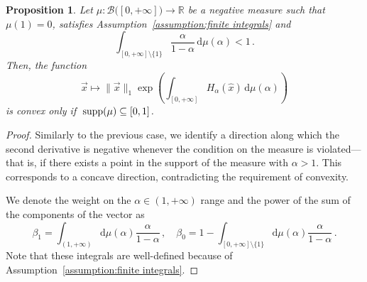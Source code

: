 \documentclass[aps,pra,11pt,onecolumn,nofootinbib,tightenlines]{revtex4-2}
\newtheorem{proposition}[theorem]{Proposition}
\theoremstyle{definition}
\def \d {\mathrm{d}}
\newcommand{\mc}[1]{\mathcal{#1}}
\newcommand{\mb}[1]{\mathbb{#1}}
\begin{document}
\begin{proposition}
\label{prop: second prop measure}
Let $\mu:\mc B\big([0,+\infty]\big)\to\mb R$ be a negative measure such that $\mu(1)=0$, satisfies Assumption~\ref{assumption:finite integrals} and 
\begin{equation}
   \int_{[0,+\infty]\setminus\{1\}} \frac{\alpha}{1-\alpha} \,\d\mu(\alpha) < 1 \,.
\end{equation}
Then, the function
\begin{equation}
    \vec{x} \longmapsto \|\vec{x}\|_1 \exp\left( \int_{[0,+\infty]} H_\alpha(\hat{x}) \,\d\mu(\alpha) \right)
\end{equation}
    is convex only if $\;\textup{supp}(\mu) \subseteq [0,1]$.
\end{proposition}
\begin{proof}
Similarly to the previous case, we identify a direction along which the second derivative is negative whenever the condition on the measure is violated—that is, if there exists a point in the support of the measure with $\alpha > 1$. This corresponds to a concave direction, contradicting the requirement of convexity. 

We denote the weight on the $\alpha\in(1,+\infty)$ range and the power of the sum of the components of the vector as
\begin{equation}
    \beta_1=\int_{(1,+\infty)} \d \mu(\alpha) \frac{\alpha}{1-\alpha} \,, \quad \beta_0=1-\int_{[0,+\infty] \setminus\{1\}} \d \mu(\alpha) \frac{\alpha}{1-\alpha} \,.
\end{equation}
Note that these integrals are well-defined because of Assumption~\ref{assumption:finite integrals}.


\end{proof}
\end{document}
